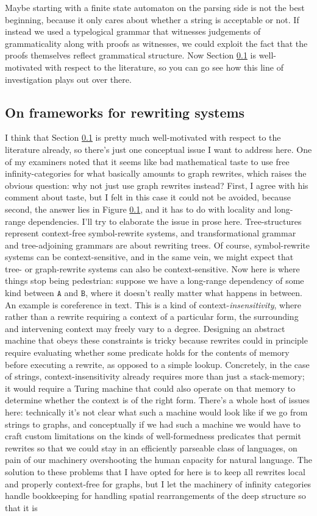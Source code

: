 Maybe starting with a finite state automaton on the parsing side is not the best beginning, because it only cares about whether a string is acceptable or not. If instead we used a typelogical grammar that witnesses judgements of grammaticality along with proofs as witnesses, we could exploit the fact that the proofs themselves reflect grammatical structure. Now Section \ref{} is well-motivated with respect to the literature, so you can go see how this line of investigation plays out over there.

\subsection{On frameworks for rewriting systems}

I think that Section \ref{} is pretty much well-motivated with respect to the literature already, so there's just one conceptual issue I want to address here. One of my examiners noted that it seems like bad mathematical taste to use free infinity-categories for what basically amounts to graph rewrites, which raises the obvious question: why not just use graph rewrites instead? First, I agree with his comment about taste, but I felt in this case it could not be avoided, because second, the answer lies in Figure \ref{}, and it has to do with locality and long-range dependencies. I'll try to elaborate the issue in prose here. Tree-structures represent context-free symbol-rewrite systems, and transformational grammar and tree-adjoining grammars are about rewriting trees. Of course, symbol-rewrite systems can be context-sensitive, and in the same vein, we might expect that tree- or graph-rewrite systems can also be context-sensitive. Now here is where things stop being pedestrian: suppose we have a long-range dependency of some kind between $\texttt{A}$ and $\texttt{B}$, where it doesn't really matter what happens in between. An example is coreference in text. This is a kind of context-\emph{insensitivity}, where rather than a rewrite requiring a context of a particular form, the surrounding and intervening context may freely vary to a degree. Designing an abstract machine that obeys these constraints is tricky because rewrites could in principle require evaluating whether some predicate holds for the contents of memory before executing a rewrite, as opposed to a simple lookup. Concretely, in the case of strings, context-insensitivity already requires more than just a stack-memory; it would require a Turing machine that could also operate on that memory to determine whether the context is of the right form. There's a whole host of issues here: technically it's not clear what such a machine would look like if we go from strings to graphs, and conceptually if we had such a machine we would have to craft custom limitations on the kinds of well-formedness predicates that permit rewrites so that we could stay in an efficiently parseable class of languages, on pain of our machinery overshooting the human capacity for natural language. The solution to these problems that I have opted for here is to keep all rewrites local and properly context-free for graphs, but I let the machinery of infinity categories handle bookkeeping for handling spatial rearrangements of the deep structure so that it is 